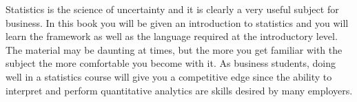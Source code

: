 Statistics is the science of uncertainty and it is clearly a very useful subject for business.
In this book you will be given an introduction to statistics and you will learn the
framework as well as the language required at the introductory level.
The material may be daunting at times, but the more you get familiar with the
subject the more comfortable you become with it.
As business students, doing well in a statistics course will give you a competitive
edge since the ability to interpret and perform quantitative analytics are skills
desired by many employers.



